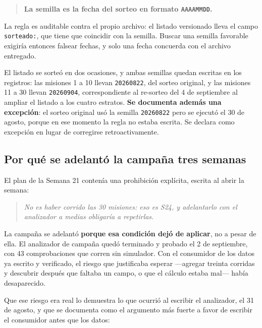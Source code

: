 \documentclass[12pt,letterpaper]{article}
\begin{document}
\begin{quote}
\textbf{La semilla es la fecha del sorteo en formato \texttt{AAAAMMDD}.}
\end{quote}

La regla es auditable contra el propio archivo: el listado versionado lleva el campo \texttt{sorteado:}, que tiene que coincidir con la semilla. Buscar una semilla favorable exigiría entonces falsear fechas, y solo una fecha concuerda con el archivo entregado.

El listado se sorteó en dos ocasiones, y ambas semillas quedan escritas en los registros: las misiones 1 a 10 llevan \texttt{20260822}, del sorteo original, y las misiones 11 a 30 llevan \texttt{20260904}, correspondiente al re-sorteo del 4 de septiembre al ampliar el listado a los cuatro estratos. \textbf{Se documenta además una excepción}: el sorteo original usó la semilla \texttt{20260822} pero se ejecutó el 30 de agosto, porque en ese momento la regla no estaba escrita. Se declara como excepción en lugar de corregirse retroactivamente.

\subsection{Por qué se adelantó la campaña tres semanas}
\label{sec:adelanto}

El plan de la Semana 21 contenía una prohibición explícita, escrita al abrir la semana:

\begin{quote}
\textit{No es haber corrido las 30 misiones: eso es S24, y adelantarlo con el analizador a medias obligaría a repetirlas.}
\end{quote}

La campaña se adelantó \textbf{porque esa condición dejó de aplicar}, no a pesar de ella. El analizador de campaña quedó terminado y probado el 2 de septiembre, con 43 comprobaciones que corren sin simulador. Con el consumidor de los datos ya escrito y verificado, el riesgo que justificaba esperar ---agregar treinta corridas y descubrir después que faltaba un campo, o que el cálculo estaba mal--- había desaparecido.

Que ese riesgo era real lo demuestra lo que ocurrió al escribir el analizador, el 31 de agosto, y que se documenta como el argumento más fuerte a favor de escribir el consumidor antes que los datos:
\end{document}
